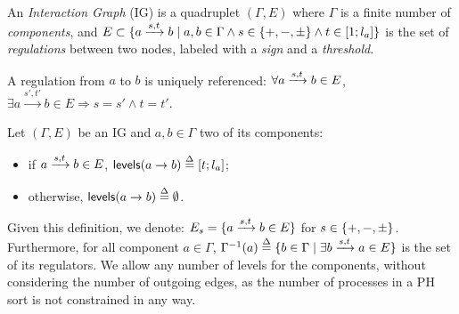 \begin{definition}
\label{def:ig}
An \emph{Interaction Graph} (IG) is a quadruplet $(\Gamma, E)$ where $\Gamma$ is a finite number of \emph{components},
and $E \subset \{ \GRNedge{a}{s}{t}{b} %
\mid a, b \in \Gamma \wedge s \in \{ +, -, \uns \} \wedge t \in [1; l_a]\}$
is the set of 
\emph{regulations} between two nodes, labeled with a \emph{sign} and a \emph{threshold}.

A regulation from $a$ to $b$ is uniquely referenced:
$\forall a \xrightarrow{s, t} b \in E$, 
$\exists a \xrightarrow{s', t'} b \in E \Rightarrow s = s' \wedge t = t'$.
\end{definition}

\begin{definition}\label{def:levels}
Let $(\Gamma,E)$ be an IG and $a, b \in \Gamma$ two of its components:
\begin{itemize}
  \item if $a \xrightarrow{s, t} b \in E$, $\mathsf{levels}(a\rightarrow b) \stackrel{\Delta}= [t; l_a]$;
  \item otherwise, $\mathsf{levels}(a\rightarrow b) \stackrel{\Delta}= \emptyset$.
\end{itemize}
\end{definition}

Given this definition, we denote:
$E_s = \{ a \xrightarrow{s, t} b \in E \}$
for $s \in \{ +, -, \pm \}$.
Furthermore,
for all component $a \in \Gamma$, 
$\Gamma^{-1}(a) \stackrel{\Delta}= \{ b\in\Gamma\mid \exists b \xrightarrow{s, t} a \in E \}$
is the set of its regulators.
We allow any number of levels for the components, without considering the number of outgoing edges,
as the number of processes in a PH sort is not constrained in any way.

